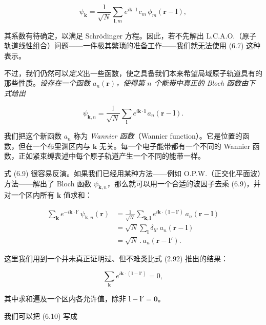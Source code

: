 \begin{equation*}
\psi_{\mathbf{k}} = \frac{1}{\sqrt{N}}\sum_{\boldsymbol{l},m} e^{i\mathbf{k}\cdot\boldsymbol{l}}\,c_m\,\phi_m(\mathbf{r}-\boldsymbol{l}),
\tag{6.8}
\end{equation*}

其系数有待确定，以满足 Schrödinger 方程。因此，若不先解出 L.C.A.O.（原子轨道线性组合）问题——一件极其繁琐的准备工作——我们就无法使用 (6.7) 这种表示。

不过，我们仍然可以\emph{定义}出一些函数，使之具备我们本来希望局域原子轨道具有的那些性质。\emph{设存在一个函数 $a_n(\mathbf{r})$，使得第 $n$ 个能带中真正的 Bloch 函数由下式给出}

\begin{equation*}
\psi_{\mathbf{k},n} = \frac{1}{\sqrt{N}}\sum_{\boldsymbol{l}} e^{i\mathbf{k}\cdot\boldsymbol{l}}\,a_n(\mathbf{r}-\boldsymbol{l}).
\tag{6.9}
\end{equation*}

我们把这个新函数 $a_n$ 称为 \emph{Wannier 函数}（Wannier function）。它是位置的函数，但在一个布里渊区内与 $\mathbf{k}$ 无关。每一个电子能带都有一个不同的 Wannier 函数，正如紧束缚表述中每个原子轨道产生一个不同的能带一样。

式 (6.9) 很容易反演。如果我们已经用某种方法——例如 O.P.W.（正交化平面波）方法——解出了 Bloch 函数 $\psi_{\mathbf{k},n}$，那么就可以用一个合适的波因子去乘 (6.9)，并对一个区内所有 $\mathbf{k}$ 值求和：

\begin{align*}
\sum_{\mathbf{k}} e^{-i\mathbf{k}\cdot\boldsymbol{l}'}\,\psi_{\mathbf{k},n}(\mathbf{r}) &= \frac{1}{\sqrt{N}}\sum_{\mathbf{k},\boldsymbol{l}} e^{i\mathbf{k}\cdot(\boldsymbol{l}-\boldsymbol{l}')}\,a_n(\mathbf{r}-\boldsymbol{l}) \\
&= \sqrt{N}\sum_{\boldsymbol{l}} \delta_{ll'}\,a_n(\mathbf{r}-\boldsymbol{l}) \\
&= \sqrt{N}\,.\,a_n(\mathbf{r}-\boldsymbol{l}'). \tag{6.10}
\end{align*}

这里我们用到一个并未真正证明过、但不难类比式 (2.92) 推出的结果：

\begin{equation*}
\sum_{\mathbf{k}} e^{i\mathbf{k}\cdot(\boldsymbol{l}-\boldsymbol{l}')} = 0,
\tag{6.11}
\end{equation*}

其中求和遍及一个区内各允许值，除非 $\boldsymbol{l}-\boldsymbol{l}'=\mathbf{0}$。

我们可以把 (6.10) 写成

